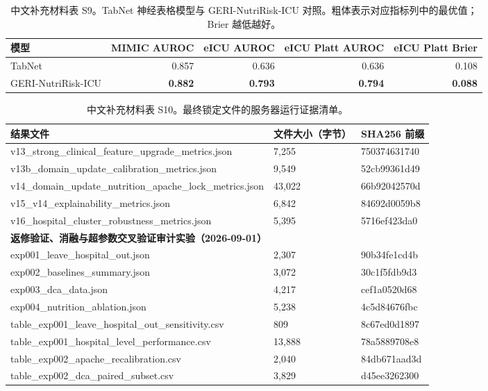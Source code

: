 \documentclass[11pt]{ctexart}
\begin{document}
\begin{table}[htbp]
\centering
\caption{中文补充材料表 S9。TabNet 神经表格模型与 GERI-NutriRisk-ICU 对照。粗体表示对应指标列中的最优值；Brier 越低越好。}
\label{tab:tabnet_s9}
\small
\begin{tabular}{lrrrr}
\toprule
模型 & MIMIC AUROC & eICU AUROC & eICU Platt AUROC & eICU Platt Brier\\
\midrule
TabNet & 0.857 & 0.636 & 0.636 & 0.108\\
GERI-NutriRisk-ICU & \textbf{0.882} & \textbf{0.793} & \textbf{0.794} & \textbf{0.088}\\
\bottomrule
\end{tabular}
\end{table}

\begin{table}[htbp]
\centering
\caption{中文补充材料表 S10。最终锁定文件的服务器运行证据清单。}
\label{tab:manifest_s10}
\small
\begin{tabular}{lll}
\toprule
结果文件 & 文件大小（字节） & SHA256 前缀\\
\midrule
v13\_strong\_clinical\_feature\_upgrade\_metrics.json & 7,255 & 750374631740\\
v13b\_domain\_update\_calibration\_metrics.json & 9,549 & 52cb99361d49\\
v14\_domain\_update\_nutrition\_apache\_lock\_metrics.json & 43,022 & 66b92042570d\\
v15\_v14\_explainability\_metrics.json & 6,842 & 84692d0059b8\\
v16\_hospital\_cluster\_robustness\_metrics.json & 5,395 & 5716ef423da0\\
\midrule
\multicolumn{3}{l}{\textbf{返修验证、消融与超参数交叉验证审计实验（2026-09-01）}}\\
exp001\_leave\_hospital\_out.json & 2,307 & 90b34fe1cd4b\\
exp002\_baselines\_summary.json & 3,072 & 30c1f5fdb9d3\\
exp003\_dca\_data.json & 4,217 & cef1a0520d68\\
exp004\_nutrition\_ablation.json & 5,238 & 4c5d84676fbc\\
table\_exp001\_leave\_hospital\_out\_sensitivity.csv & 809 & 8c67ed0d1897\\
table\_exp001\_hospital\_level\_performance.csv & 13,888 & 78a5889708e8\\
table\_exp002\_apache\_recalibration.csv & 2,040 & 84db671aad3d\\
table\_exp002\_dca\_paired\_subset.csv & 3,829 & d45ee3262300\\

\end{tabular}
\end{table}
\end{document}

